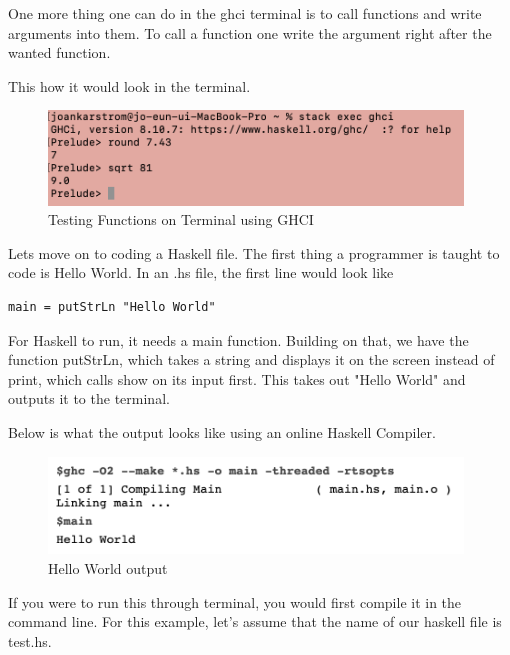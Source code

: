 \documentclass{article}
\begin{document}
\medskip\noindent
One more thing one can do in the ghci terminal is to call functions and write arguments into them. To call a function one write the argument right after the wanted function. 

\medskip\noindent
This how it would look in the terminal. 

\medskip\noindent 
\begin{figure}[htp]
    \centering
    \includegraphics[width=11cm]{TerminalFunction.png}
    \caption{Testing Functions on Terminal using GHCI}
    \label{fig:testing addition}
\end{figure}

\medskip\noindent
Lets move on to coding a Haskell file. The first thing a programmer is taught to code is Hello World. In an .hs file, the first line would look like

\medskip\noindent
\begin{lstlisting}
main = putStrLn "Hello World"
\end{lstlisting}

\medskip\noindent
For Haskell to run, it needs a main function. Building on that, we have the function putStrLn, which takes a string and displays it on the screen instead of print, which calls show on its input first. This takes out "Hello World" and outputs it to the terminal.

\medskip\noindent
Below is what the output looks like using an online Haskell Compiler. 

\medskip\noindent 
\begin{figure}[htp]
    \centering
    \includegraphics[width=11cm]{OutputHello.png}
    \caption{Hello World output}
    \label{fig:hello world}
\end{figure}

\medskip\noindent
If you were to run this through terminal, you would first compile it in the command line. For this example, let’s assume that the name of our haskell file is test.hs. 
\end{document}
